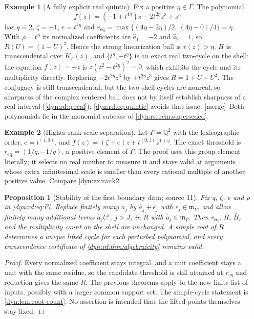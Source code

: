 \documentclass[11pt,letterpaper]{article}
\newtheorem{proposition}[proposition]{Proposition}
\theoremstyle{definition}
\newtheorem{example}[example]{Example}
\theoremstyle{remark}
\newcommand{\Q}{\mathbb Q}
\newcommand{\m}{\mathfrak m}
\newcommand{\mergetag}{\textup{\textsf{\small[merge]}}}%
\numberwithin{equation}{section}
\begin{document}
\begin{example}[A fully explicit real quintic]\label{dyn:rd:ex:quintic}
Fix a positive $\eta\in\Gamma$. The polynomial
\begin{equation}\label{dyn:rd:eq:quintic}
 f(z)=(-1+t^{4\eta})z-2t^{2\eta}z^{3}+z^{5}
\end{equation}
has $q=2$, $\zeta=-1$, $e=t^{4\eta}$ and
$r_{\mathrm{eq}}=\max\{(4\eta-2\eta)/2,\,(4\eta-0)/4\}=\eta$. With
$\rho=t^{\eta}$ its normalized coefficients are $\hat a_1=-2$ and
$\hat a_2=1$, so $R(U)=(1-U)^{2}$. Hence the strong linearization ball is
$v(z)>\eta$, $H$ is transcendental over $K_\Gamma(z)$, and
$\{t^{\eta},-t^{\eta}\}$ is an exact real two-cycle on the shell: the
equation $f(z)=-z$ is $z(z^{2}-t^{2\eta})^{2}=0$, which exhibits the cycle
and its multiplicity directly. Replacing $-2t^{2\eta}z^{3}$ by
$+t^{2\eta}z^{3}$ gives $R=1+U+U^{2}$. The conjugacy is still
transcendental, but the two shell cycles are nonreal, so sharpness of the
complex centered ball does not by itself establish sharpness of a real
interval (\cref{dyn:rd:q:real}); \eqref{dyn:rd:eq:quintic} avoids that
issue. \mergetag\ Both polynomials lie in the monomial subcase of
\cref{dyn:rd:rem:superseded}.
\end{example}

\begin{example}[Higher-rank scale separation]\label{dyn:rd:ex:rank2}
Let $\Gamma=\Q^{2}$ with the lexicographic order, $e=t^{(1,0)}$, and
$f(z)=(\zeta+e)z+t^{(0,1)}z^{1+q}$. The exact threshold is
$r_{\mathrm{eq}}=(1/q,-1/q)$, a positive element of $\Gamma$. The proof uses
this group element literally; it selects no real number to measure it and
stays valid at arguments whose extra infinitesimal scale is smaller than
every rational multiple of another positive value. Compare
\cref{dyn:ex:rank2}.
\end{example}

\begin{proposition}[Stability of the first boundary data; source 11]
\label{dyn:rd:prop:stability}
Fix $q$, $\zeta$, $e$ and $\rho$ in \eqref{dyn:rd:eq:F}. Replace finitely
many $\hat a_j$ by $\hat a_j+\epsilon_j$ with $\epsilon_j\in\m_\Gamma$, and
allow finitely many additional terms $\hat a_jU^{j}$, $j>J$, in
$\widehat R$ with $\hat a_j\in\m_\Gamma$. Then $r_{\mathrm{eq}}$, $R$,
$\bar H_r$ and the multiplicity count on the shell are unchanged. A simple
root of $R$ determines a unique lifted cycle for each perturbed polynomial,
and every transcendence certificate of \cref{dyn:rd:thm:algebraicity}
remains valid.
\end{proposition}
\begin{proof}
Every normalized coefficient stays integral, and a unit coefficient stays a
unit with the same residue, so the candidate threshold is still attained at
$r_{\mathrm{eq}}$ and reduction gives the same $R$. The previous theorems
apply to the new finite list of inputs, possibly with a larger common
support set. The simple-cycle statement is \cref{dyn:lem:root-count}. No
assertion is intended that the lifted points themselves stay fixed.
\end{proof}
\end{document}
